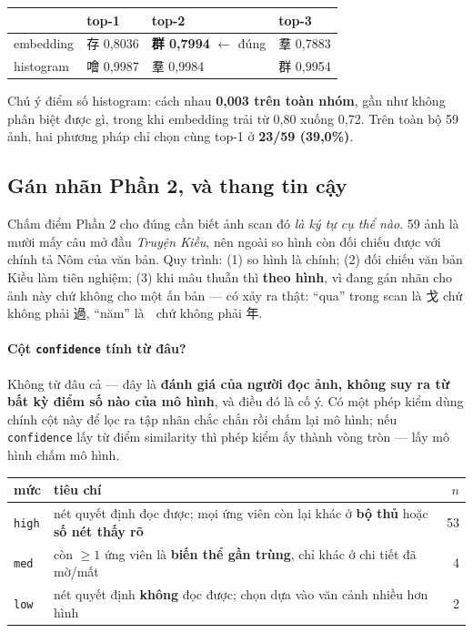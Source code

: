 \documentclass[11pt,a4paper]{article}
\newcommand{\nom}[1]{{\nomfont #1}}
\newcommand{\code}[1]{\texttt{#1}}
\begin{document}
\begin{center}
\begin{tabular}{llll}
\toprule
 & top-1 & top-2 & top-3 \\
\midrule
embedding & \nom{存} 0,8036 & \textbf{\nom{群} 0,7994} $\leftarrow$ đúng & \nom{羣} 0,7883 \\
histogram & \nom{噲} 0,9987 & \nom{羣} 0,9984 & \nom{群} 0,9954 \\
\bottomrule
\end{tabular}
\end{center}

Chú ý điểm số histogram: cách nhau \textbf{0,003 trên toàn nhóm}, gần như không phân biệt được gì,
trong khi embedding trải từ 0,80 xuống 0,72. Trên toàn bộ 59 ảnh, hai phương pháp chỉ chọn cùng
top-1 ở \textbf{23/59 (39,0\%)}.

\subsection{Gán nhãn Phần 2, và thang tin cậy}

Chấm điểm Phần 2 cho đúng cần biết ảnh scan đó \emph{là ký tự cụ thể nào}. 59 ảnh là mười mấy câu
mở đầu \emph{Truyện Kiều}, nên ngoài so hình còn đối chiếu được với chính tả Nôm của văn bản. Quy
trình: (1) so hình là chính; (2) đối chiếu văn bản Kiều làm tiên nghiệm; (3) khi mâu thuẫn thì
\textbf{theo hình}, vì đang gán nhãn cho ảnh này chứ không cho một ấn bản --- có xảy ra thật:
``qua'' trong scan là \nom{戈} chứ không phải \nom{過}, ``năm'' là \nom{𢆥} chứ không phải \nom{年}.

\paragraph{Cột \code{confidence} tính từ đâu?} Không từ đâu cả --- đây là \textbf{đánh giá của người
đọc ảnh, không suy ra từ bất kỳ điểm số nào của mô hình}, và điều đó là cố ý. Có một phép kiểm dùng
chính cột này để lọc ra tập nhãn chắc chắn rồi chấm lại mô hình; nếu \code{confidence} lấy từ điểm
similarity thì phép kiểm ấy thành vòng tròn --- lấy mô hình chấm mô hình.

\begin{table}[h]
\centering
\begin{tabular}{llr}
\toprule
mức & tiêu chí & $n$ \\
\midrule
\code{high} & nét quyết định đọc được; mọi ứng viên còn lại khác ở \textbf{bộ thủ} hoặc \textbf{số nét thấy rõ} & 53 \\
\code{med} & còn $\geq 1$ ứng viên là \textbf{biến thể gần trùng}, chỉ khác ở chi tiết đã mờ/mất & 4 \\
\code{low} & nét quyết định \textbf{không} đọc được; chọn dựa vào văn cảnh nhiều hơn hình & 2 \\
\bottomrule
\end{tabular}
\end{table}
\end{document}
